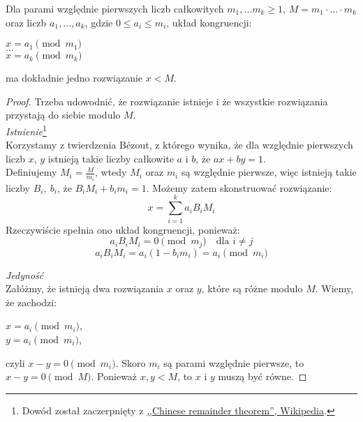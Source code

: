 \begin{theorem}
    Dla parami względnie pierwszych liczb całkowitych \( m_1, \dots m_k \geq 1 \), \( M = m_1 \cdot \ldots \cdot m_k \) oraz liczb \( a_1, \ldots, a_k \), gdzie \( 0 \leq a_i \leq m_i \), układ kongruencji:
    \begin{center}
        \( x = a_1 \pmod{m_1} \) \\
        \( \dots \) \\
        \( x = a_k \pmod{m_k} \)
    \end{center}
    ma dokładnie jedno rozwiązanie \( x < M \).
\end{theorem}
\begin{proof}
    Trzeba udowodnić, że rozwiązanie istnieje i że wszystkie rozwiązania przystają do siebie modulo \( M \). \\
    \textit{Istnienie}\footnote{Dowód został zaczerpnięty z \href{https://en.wikipedia.org/wiki/Chinese_remainder_theorem#Proof}{,,Chinese remainder theorem'', Wikipedia}.} \\
    Korzystamy z twierdzenia B\'ezout, z którego wynika, że dla względnie pierwszych liczb \( x \), \( y \) istnieją takie liczby całkowite \( a \) i \( b \), że \( ax + by = 1 \). \\
    Definiujemy \( M_i = \frac{M}{m_i} \), wtedy \( M_i \) oraz \( m_i \) są względnie pierwsze, więc istnieją takie liczby \( B_i, \ b_i \), że \( B_iM_i + b_im_i = 1 \).
    Możemy zatem skonstruować rozwiązanie:
    \[
        x = \sum_{i=1}^{k} a_iB_iM_i
    \]
    Rzeczywiście spełnia ono układ kongruencji, ponieważ:
    \[
        a_iB_iM_i = 0 \pmod{m_j} \quad \text{dla } i \neq j
    \]
    \[
        a_iB_iM_i = a_i(1 - b_im_i) = a_i \pmod{m_i}
    \]

    \textit{Jedyność} \\
    Załóżmy, że istnieją dwa rozwiązania \( x \) oraz \( y \), które są różne modulo \( M \). Wiemy, że zachodzi:
    \begin{center}
        \( x = a_i \pmod{m_i} \), \\
        \( y = a_i \pmod{m_i} \),
    \end{center}
    czyli \( x - y = 0 \pmod{m_i} \). Skoro \( m_i \) są parami względnie pierwsze, to \(  x - y = 0 \pmod{M} \).
    Ponieważ \( x, y < M \), to \( x \) i \( y \) muszą być równe.
\end{proof}